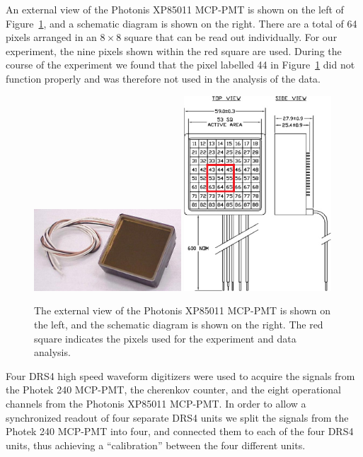 An external view
of the Photonis XP85011 MCP-PMT is shown on the left of Figure~\ref{fig:photonis},
and a schematic diagram is shown on the right. There are a total of 64 pixels
arranged in an $8\times8$ square that can be read out individually. For our
experiment, the nine pixels shown within the red square are used. During the
course of the experiment we found that the pixel labelled 44 in
Figure~\ref{fig:photonis} did not function properly and was therefore not used
in the analysis of the data. 

\begin{figure}[htbp] 
\centering
\includegraphics[width=0.49\textwidth]{Images/photonis/photonis.jpg}
\includegraphics[width=0.49\textwidth]{Images/photonis/photonis2.png}
\caption{The external view of the Photonis XP85011 MCP-PMT is shown on the left, and
the schematic diagram is shown on the right. The red square indicates the pixels
used for the experiment and data analysis.} 
\label{fig:photonis} 
\end{figure}

Four DRS4 high speed waveform digitizers were used to acquire the signals from
the Photek 240 MCP-PMT, the cherenkov counter, and the eight operational
channels from the Photonis XP85011 MCP-PMT. In order to allow a synchronized
readout of four separate DRS4 units we split the signals from the Photek 240
MCP-PMT into four, and connected them to each of the four DRS4 units, thus achieving
a ``calibration'' between the four different units.  

